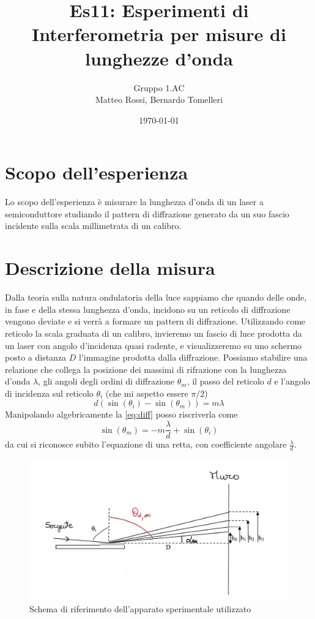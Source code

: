 \documentclass[10pt, a4paper, italian]{article}
\author{Gruppo 1.AC \\ Matteo Rossi, Bernardo Tomelleri}
\title{Es11: Esperimenti di Interferometria per misure di lunghezze d'onda}
\begin{document}
\date{\today}
\maketitle

\section{Scopo dell'esperienza}
Lo scopo dell'esperienza è misurare la lunghezza d'onda di un laser
a semiconduttore studiando il pattern di diffrazione generato da un suo
fascio incidente sulla scala millimetrata di un calibro.

\section{Descrizione della misura}
Dalla teoria sulla natura ondulatoria della luce sappiamo che quando delle onde, in fase e della stessa lunghezza d'onda, incidono su un reticolo di diffrazione vengono deviate e si verrà a formare un pattern di diffrazione.
Utilizzando come reticolo la scala graduata di un calibro, invieremo un fascio di luce prodotta da un laser con angolo d'incidenza quasi radente, e visualizzeremo su uno schermo posto a distanza $D$ l'immagine prodotta dalla diffrazione.
Possiamo stabilire una relazione che collega la posizione dei massimi di rifrazione con la lunghezza d'onda $\lambda$, gli angoli degli ordini di diffrazione $\theta _m$, il passo del reticolo $d$ e l'angolo di incidenza sul reticolo $\theta _i$ (che mi aspetto essere $\pi /2$)
\begin{equation}
d(\sin(\theta _i) - \sin(\theta _m))=m \lambda
\label{eq:diff}
\end{equation}
Manipolando algebricamente la \ref{eq:diff} posso riscriverla come
\begin{equation}
\sin(\theta _m) = -m \frac{\lambda}{d} + \sin(\theta _i) 
\label{eq:fit}
\end{equation}
 da cui si riconosce subito l'equazione di una retta, con coefficiente angolare $\frac{\lambda}{d}$.
\begin{figure}
\includegraphics[width=\textwidth]{0}
\caption{ \label{schema1} Schema di riferimento dell'apparato sperimentale utilizzato}
\end{figure}
\end{document}
